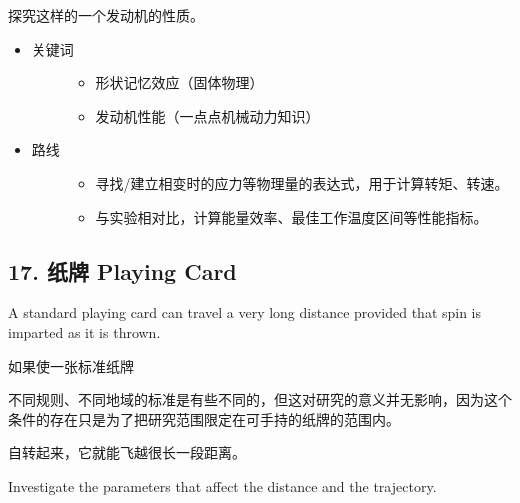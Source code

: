 \documentclass[a4paper,10pt,english]{sphinxmanual}
\begin{document}
探究这样的一个发动机的性质。
\begin{itemize}
\item {} \begin{description}
\item[{关键词}] \leavevmode\begin{itemize}
\item {} 
形状记忆效应（固体物理）

\item {} 
发动机性能（一点点机械动力知识）

\end{itemize}

\end{description}

\item {} \begin{description}
\item[{路线}] \leavevmode\begin{itemize}
\item {} 
寻找/建立相变时的应力等物理量的表达式，用于计算转矩、转速。

\item {} 
与实验相对比，计算能量效率、最佳工作温度区间等性能指标。

\end{itemize}

\end{description}

\end{itemize}


\subsection{17. 纸牌 Playing Card}
\label{\detokenize{7. Appendix:playing-card}}
A standard playing card can travel a very long distance provided that spin is imparted as it is thrown.

如果使一张标准纸牌 %
\begin{footnote}[12]\sphinxAtStartFootnote
不同规则、不同地域的标准是有些不同的，但这对研究的意义并无影响，因为这个条件的存在只是为了把研究范围限定在可手持的纸牌的范围内。
%
\end{footnote} 自转起来，它就能飞越很长一段距离。

Investigate the parameters that affect the distance and the trajectory.
\end{document}
